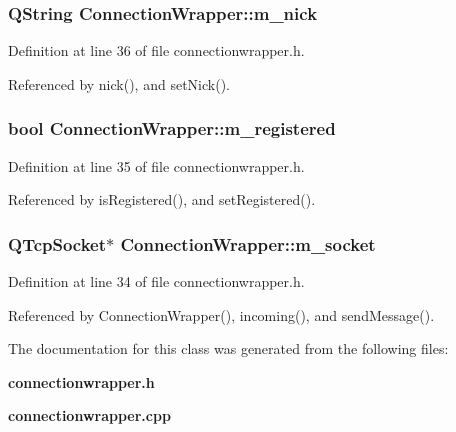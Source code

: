 \subsubsection{\setlength{\rightskip}{0pt plus 5cm}QString {\bf ConnectionWrapper::m\_\-nick}\hspace{0.3cm}{\tt  [private]}}\label{classConnectionWrapper_07c153e161dc59e1ab0960030e6e0b47}




Definition at line 36 of file connectionwrapper.h.

Referenced by nick(), and setNick().
\subsubsection{\setlength{\rightskip}{0pt plus 5cm}bool {\bf ConnectionWrapper::m\_\-registered}\hspace{0.3cm}{\tt  [private]}}\label{classConnectionWrapper_ee9c1417f0d1da5df12c1275c6d4c4ac}




Definition at line 35 of file connectionwrapper.h.

Referenced by isRegistered(), and setRegistered().
\subsubsection{\setlength{\rightskip}{0pt plus 5cm}QTcpSocket$\ast$ {\bf ConnectionWrapper::m\_\-socket}\hspace{0.3cm}{\tt  [private]}}\label{classConnectionWrapper_3a5237162b8e97ba0542e063e8271827}




Definition at line 34 of file connectionwrapper.h.

Referenced by ConnectionWrapper(), incoming(), and sendMessage().

The documentation for this class was generated from the following files:\begin{CompactItemize}
\item 
{\bf connectionwrapper.h}\item 
{\bf connectionwrapper.cpp}\end{CompactItemize}
